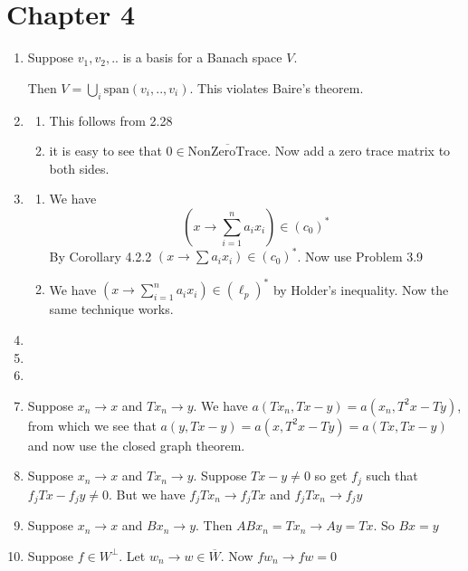 \documentclass{article}
\begin{document}
\section*{Chapter 4}

\begin{enumerate}
    \item Suppose $v_1,v_2,..$ is a basis for a Banach space $V$. 
    
    Then $V=\bigcup_{i}\text{span}(v_i,..,v_i)$. This violates Baire's theorem.

    \item \begin{enumerate}
        \item This follows from 2.28
        \item it is easy to see that $0 \in \overline{\text{NonZeroTrace}}$. Now add a zero trace matrix to both sides.
    \end{enumerate}

    \item \begin{enumerate}
        \item We have \[(x \to \sum_{i=1}^na_ix_i) \in (c_0)^*\]
              By Corollary 4.2.2 $(x \to \sum a_ix_i) \in (c_0)^*$. Now use Problem 3.9

        \item We have $(x \to \sum_{i=1}^na_ix_i) \in (\ell_p)^*$ by Holder's inequality. Now the same technique works.
    \end{enumerate}

    \item 
    \item 
    \item 
    \item Suppose $x_n \to x$ and $Tx_n \to y$. We have $a(Tx_n,Tx-y)=a(x_n,T^2x-Ty)$, from which we see that $a(y,Tx-y)=a(x,T^2x-Ty)=a(Tx,Tx-y)$ and now use the closed graph theorem.

    \item Suppose $x_n \to x$ and $Tx_n \to y$. Suppose $Tx-y \neq 0$ so get $f_j$ such that $f_jTx-f_jy \neq 0$. But we have $f_jTx_n \to f_jTx$ and $f_jTx_n \to f_jy$

    \item Suppose $x_n \to x$ and $Bx_n \to y$. Then $ABx_n=Tx_n \to Ay=Tx$. So $Bx=y$

    \item Suppose $f \in W^\perp$. Let $w_n \to w \in \overline{W}$. Now $fw_n \to fw=0$


\end{enumerate}
\end{document}
